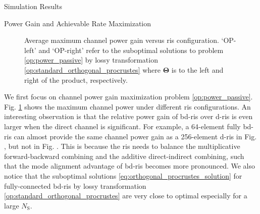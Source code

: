 \documentclass[journal]{IEEEtran}
\begin{document}
\begin{section}{Simulation Results}
	\begin{subsection}{Power Gain and Achievable Rate Maximization}
		\begin{figure}[!t]
			\centering
			\caption{
				Average maximum channel power gain versus \gls{ris} configuration.
				`OP-left' and `OP-right' refer to the suboptimal solutions to problem \eqref{op:power_passive} by lossy transformation \eqref{op:standard_orthogonal_procrustes} where $\mathbf{\Theta}$ is to the left and right of the product, respectively.
			}
			\label{fg:power_sx}
		\end{figure}

		We first focus on channel power gain maximization problem \eqref{op:power_passive}.
		Fig. \ref{fg:power_sx} shows the maximum channel power under different \gls{ris} configurations.
		An interesting observation is that the relative power gain of \gls{bd}-\gls{ris} over \gls{d}-\gls{ris} is even larger when the direct channel is significant.
		For example, a 64-element fully \gls{bd}-\gls{ris} can almost provide the same channel power gain as a 256-element \gls{d}-\gls{ris} in Fig. , but not in Fig. .
		This is because the \gls{ris} needs to balance the multiplicative forward-backward combining and the additive direct-indirect combining, such that the mode alignment advantage of \gls{bd}-\gls{ris} becomes more pronounced.
		We also notice that the suboptimal solutions \eqref{eq:orthogonal_procrustes_solution} for fully-connected \gls{bd}-\gls{ris} by lossy transformation \eqref{op:standard_orthogonal_procrustes} are very close to optimal especially for a large $N_\mathrm{S}$.


\end{subsection}
\end{section}
\end{document}
